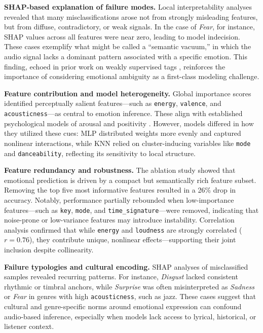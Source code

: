 \documentclass{article}
\begin{document}
\textbf{SHAP-based explanation of failure modes.} Local interpretability analyses revealed that many misclassifications arose not from strongly misleading features, but from diffuse, contradictory, or weak signals. In the case of \textit{Fear}, for instance, SHAP values across all features were near zero, leading to model indecision. These cases exemplify what might be called a “semantic vacuum,” in which the audio signal lacks a dominant pattern associated with a specific emotion. This finding, echoed in prior work on weakly supervised tags \parencite{Artemova2025, Kim2024}, reinforces the importance of considering emotional ambiguity as a first-class modeling challenge.

\textbf{Feature contribution and model heterogeneity.} Global importance scores identified perceptually salient features—such as \texttt{energy}, \texttt{valence}, and \texttt{acousticness}—as central to emotion inference. These align with established psychological models of arousal and positivity \parencite{Huron2015, McCraty1998}. However, models differed in how they utilized these cues: MLP distributed weights more evenly and captured nonlinear interactions, while KNN relied on cluster-inducing variables like \texttt{mode} and \texttt{danceability}, reflecting its sensitivity to local structure.

\textbf{Feature redundancy and robustness.} The ablation study showed that emotional prediction is driven by a compact but semantically rich feature subset. Removing the top five most informative features resulted in a 26\% drop in accuracy. Notably, performance partially rebounded when low-importance features—such as \texttt{key}, \texttt{mode}, and \texttt{time\_signature}—were removed, indicating that noise-prone or low-variance features may introduce instability. Correlation analysis confirmed that while \texttt{energy} and \texttt{loudness} are strongly correlated ($r = 0.76$), they contribute unique, nonlinear effects—supporting their joint inclusion despite collinearity.

\textbf{Failure typologies and cultural encoding.} SHAP analyses of misclassified samples revealed recurring patterns. For instance, \textit{Disgust} lacked consistent rhythmic or timbral anchors, while \textit{Surprise} was often misinterpreted as \textit{Sadness} or \textit{Fear} in genres with high \texttt{acousticness}, such as jazz. These cases suggest that cultural and genre-specific norms around emotional expression can confound audio-based inference, especially when models lack access to lyrical, historical, or listener context.
\end{document}
